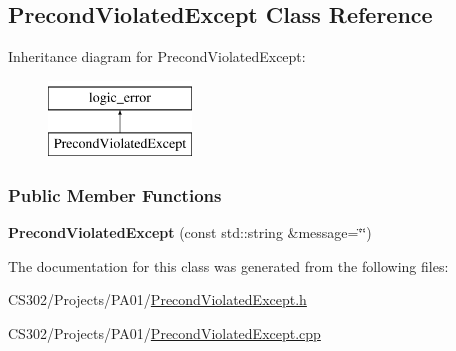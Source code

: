 \hypertarget{class_precond_violated_except}{}\subsection{Precond\+Violated\+Except Class Reference}
\label{class_precond_violated_except}
Inheritance diagram for Precond\+Violated\+Except\+:\begin{figure}[H]
\begin{center}
\leavevmode
\includegraphics[height=2.000000cm]{class_precond_violated_except}
\end{center}
\end{figure}
\subsubsection*{Public Member Functions}
\begin{DoxyCompactItemize}
\item 
{\bfseries Precond\+Violated\+Except} (const std\+::string \&message=\char`\"{}\char`\"{})\hypertarget{class_precond_violated_except_a13c9075198f291ffc9a74c0c9b787ecf}{}\label{class_precond_violated_except_a13c9075198f291ffc9a74c0c9b787ecf}

\end{DoxyCompactItemize}


The documentation for this class was generated from the following files\+:\begin{DoxyCompactItemize}
\item 
C\+S302/\+Projects/\+P\+A01/\hyperlink{_precond_violated_except_8h}{Precond\+Violated\+Except.\+h}\item 
C\+S302/\+Projects/\+P\+A01/\hyperlink{_precond_violated_except_8cpp}{Precond\+Violated\+Except.\+cpp}\end{DoxyCompactItemize}
